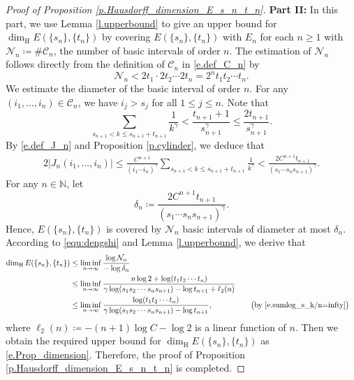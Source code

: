 \documentclass[12pt,reqno]{amsart}
\renewcommand{\=}{\coloneqq}
\theoremstyle{plain}
\begin{document}
\begin{proof}[Proof of Proposition \ref{p.Hausdorff_dimension_E_s_n_t_n}]
\textbf{Part II:} In this part, we use Lemma \ref{l.upperbound} to give an upper bound for $\dim_{\mathrm{H}} E(\{s_n\},\{t_n\})$ by covering $E(\{s_n\},\{t_n\})$ with $E_n$ for each $n\geq 1$ with $\mathcal{N} _n \coloneqq \#\mathcal{C} _n$, the number of basic intervals of order $n$.
The estimation of $\mathcal{N} _n$ follows directly from the definition of $\mathcal{C} _n$ in \eqref{e.def_C_n} by
        \begin{equation*}\label{e.estimate_N_n}
                \mathcal{N} _n<2t_1\cdot2t_2\cdots 2t_n=
                2^nt_1t_2\cdots t_n.
        \end{equation*}
We estimate the diameter of the basic interval of order $n$. For any $(i_1, \dots, i_{n})\in\mathcal{C} _{n}$, we have $i_{j} >s_j$ for all $1\leq j\leq n$. Note that
 \begin{equation*}
 \sum_{s_{n+1}<k\leq s_{n+1}+t_{n+1}}\frac{1}{k^{\gamma}} <\frac{t_{n+1}+1}{s_{n+1}^{\gamma}} \leq  \frac{2t_{n+1}}{s_{n+1}^{\gamma}}.
        \end{equation*}
By \eqref{e.def_J_n} and Proposition \ref{p.cylinder}, we deduce that
    \begin{alignat*}{2}
                |J_n(i_1, \dots, i_{n})|
                \leq \frac{C^{n+1}}{(i_1\cdots i_{n})^{\gamma}}\sum_{s_{n+1}<k\leq s_{n+1}+t_{n+1}}
                \frac{1}{k^{\gamma}}
               < \frac{2C^{n+1}t_{n+1}}{(s_1\cdots
                s_ns_{n+1})^{\gamma}}.
        \end{alignat*}
For any $n \in \mathbb N$, let
  \begin{equation*}
 \delta_n \coloneqq  \frac{2C^{n+1}t_{n+1}}{(s_1\cdots
                s_ns_{n+1})^{\gamma}}.
        \end{equation*}
Hence, $E(\{s_n\},\{t_n\})$ is covered by $\mathcal{N}_n$ basic intervals of diameter at most $\delta_n$. According to \eqref{equ:dengshi} and Lemma \ref{l.upperbound}, we derive that
 \begin{alignat*}{2}
                \dim_{\mathrm{H}}E(\{s_n\},\{t_n\})
               & \leq \liminf_{n\to \infty}\frac{\log \mathcal{N} _n}
                {-\log \delta_n}\\
               & \leq  \liminf_{n\to \infty}
                \frac{n\log 2+\log (t_1t_2\cdots t_n)}
                {\gamma \log(s_1s_2\cdots s_ns_{n+1})-\log t_{n+1}
                +\ell_2(n)} \\
               & \leq  \liminf_{n\to \infty}
                \frac{\log (t_1t_2\cdots t_n)}
                {\gamma\log(s_1s_2\cdots s_ns_{n+1})-\log t_{n+1}},
                && \quad  \big( \text{by}\
                \eqref{e.sumlog_s_k/n=infty}\big) \notag
        \end{alignat*}
where $\ell_2(n)\coloneqq -(n+1)\log C-\log 2$ is a linear function of $n$. Then we obtain the required upper bound for $\dim_{\mathrm{H}}E(\{s_n\},\{t_n\})$ as \eqref{e.Prop_dimension}. Therefore, the proof of Proposition \ref{p.Hausdorff_dimension_E_s_n_t_n} is completed.
\end{proof}
\end{document}
